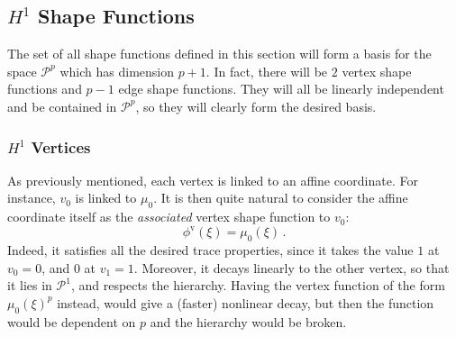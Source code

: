 \subsection{\texorpdfstring{$H^1$}{H1} Shape Functions}

The set of all shape functions defined in this section will form a basis for the space $\mathcal{P}^p$ which has dimension $p+1$.
In fact, there will be $2$ vertex shape functions and $p-1$ edge shape functions.
They will all be linearly independent and be contained in $\mathcal{P}^p$, so they will clearly form the desired basis.

\subsubsection{\texorpdfstring{$H^1$}{H1} Vertices}

As previously mentioned, each vertex is linked to an affine coordinate.
For instance, $v_0$ is linked to $\mu_0$.
It is then quite natural to consider the affine coordinate itself as the \textit{associated} vertex shape function to $v_0$:
\begin{equation*}
	\phi^\mathrm{v}(\xi)=\mu_0(\xi)\,.
\end{equation*}
Indeed, it satisfies all the desired trace properties, since it takes the value $1$ at $v_0=0$, and $0$ at $v_1=1$.
Moreover, it decays linearly to the other vertex, so that it lies in $\mathcal{P}^1$, and respects the hierarchy.
Having the vertex function of the form $\mu_0(\xi)^p$ instead, would give a (faster) nonlinear decay, but then the function would be dependent on $p$ and the hierarchy would be broken.

